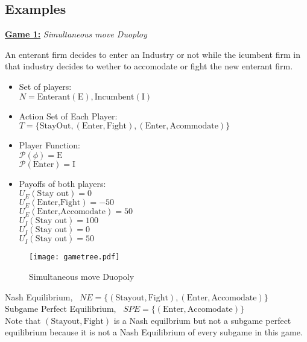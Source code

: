 \documentclass[10pt,leqno]{report}
\begin{document}
\subsection*{Examples}
\textbf{\underline{Game 1:}} \textit{Simultaneous move Duoploy}
\begin{tcolorbox}
An enterant firm decides to enter an Industry or not while the icumbent firm in that industry decides to wether to accomodate or fight the new enterant firm.\\
\begin{itemize}
\item Set of players: \\ \(N={\mathrm{Enterant(E),Incumbent(I)}}\) \\
\item Action Set of Each Player: \\ \(T=\{\mathrm{Stay Out,(Enter,Fight),(Enter,Acommodate)}\}\) \\
\item Player Function: \\ \(\mathcal{P}(\phi)=\text{E}\) \\ 
      \(\mathcal{P}(\text{Enter})= \text{I}\)\\
\item Payoffs of both players: \\ \(U_{E}(\text{Stay out})=0\)\\
      \(U_{E}(\text{Enter,Fight})=-50\)\\
      \(U_{E}(\text{Enter,Accomodate})=50\)\\
      \(U_{I}(\text{Stay out})=100\)\\
      \(U_{I}(\text{Stay out})=0\)\\
      \(U_{I}(\text{Stay out})=50\)\\
\end{itemize}
\end{tcolorbox}
\begin{figure}[H]
    \centering
     \texttt{[image: gametree.pdf]}
    \caption{Simultaneous move Duopoly}
\end{figure}
Nash Equilibrium, \ \(NE=\{\mathrm{(Stay out,Fight),(Enter,Accomodate)}\}\) \\
Subgame Perfect Equilibrium, \ \(SPE=\{\mathrm{(Enter,Accomodate)}\}\)\\
\linebreak
Note that \(\mathrm{(Stay out, Fight)}\) is a Nash equilbrium but not a subgame perfect equilibrium because it is not a Nash Equilibrium of every subgame in this game. \\
\end{document}
